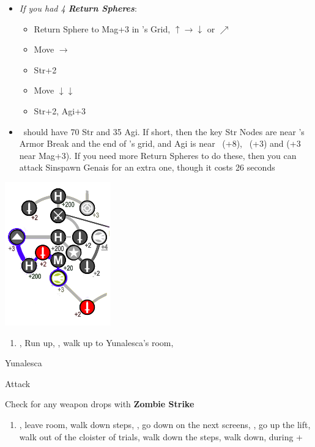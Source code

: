 \begin{spheregrid}
	\begin{itemize}
		\item \textit{If you had 4 \textbf{Return Spheres}}:
		      \begin{itemize}
			      \item Return Sphere to Mag+3 in \wakka's Grid, $\uparrow\rightarrow\downarrow$ or $\nearrow$
			      \item Move $\rightarrow$
			      \item Str+2
			      \item Move $\downarrow\downarrow$
			      \item Str+2, Agi+3
		      \end{itemize}
		\item \yuna\ should have 70 Str and 35 Agi. If short, then the key Str Nodes are near \tidus's Armor Break and the end of \wakka's grid, and Agi is near \lulu\ (+8), \rikku\ (+3) and \wakka (+3 near Mag+3). If you need more Return Spheres to do these, then you can attack Sinspawn Genais for an extra one, though it costs 26 seconds
	\end{itemize}
	\includegraphics[width=.5\columnwidth]{graphics/4_return_before_yunalesca}
\end{spheregrid}
\begin{enumerate}[resume]
	\item \save, Run up, \sd, walk up to Yunalesca's room, \sd
\end{enumerate}
\begin{battle}[132000]{Yunalesca}
	\begin{itemize}
		\summon{\bahamut}
		\bahamutf Attack
	\end{itemize}
	Check for any weapon drops with \textbf{Zombie Strike}
\end{battle}
\begin{enumerate}[resume]
	\item \sd, leave room, walk down steps, \sd, go down on the next screens, \save, go up the lift, walk out of the cloister of trials, walk down the steps, walk down, \sd during \cs+\skippablefmv
\end{enumerate}